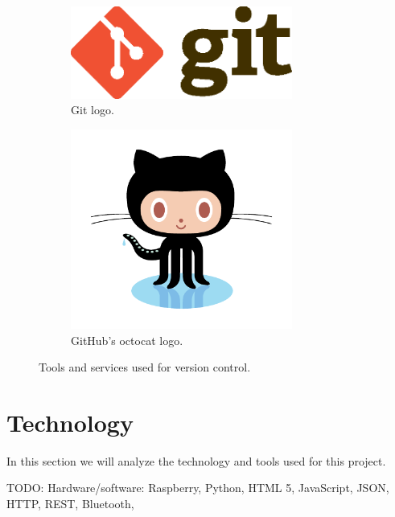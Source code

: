 \begin{figure}[!htbp]
	\centering
	\begin{subfigure}{0.6\textwidth}
		\centering
		\includegraphics[width=0.8\textwidth]{fig/git.eps}
		\caption{Git logo.}\label{subfig:git}
	\end{subfigure}\quad
	\begin{subfigure}{0.3\textwidth}
		\centering
		\includegraphics[width=0.8\textwidth]{fig/github}
		\caption{GitHub's octocat logo.}\label{subfig:github}
	\end{subfigure}\quad
	\caption{Tools and services used for version control.}
\end{figure}

\section{Technology}

In this section we will analyze the technology and tools used for this project.

TODO: Hardware/software: Raspberry, Python, HTML 5, JavaScript, JSON, HTTP, REST, Bluetooth,
